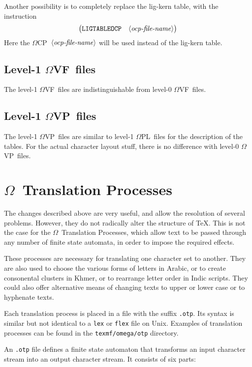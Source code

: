 \documentclass[fleqn]{article}
\newcommand{\OMEGA}{$\Omega$}
\newcommand{\OCP}{\OMEGA CP}
\newcommand{\OPL}{\OMEGA PL}
\newcommand{\OVF}{\OMEGA VF}
\newcommand{\OVP}{\OMEGA VP}
\newcommand{\showligocp}{\langle\mbox{\emph{ocp-file-name}}\rangle}
\begin{document}
Another possibility is to completely replace the lig-kern table,
with the instruction
\[
\begin{array}{ll}
     \bigl(\texttt{LIGTABLEOCP} & \showligocp\bigr)\\
\end{array}
\]
Here the \OCP\ $\showligocp$ will be used instead of the lig-kern
table.

\subsection{Level-1 \OVF\ files}

The level-1 \OVF\ files are indistinguishable from level-0
\OVF\ files.

\subsection{Level-1 \OVP\ files}

The level-1 \OVP\ files are similar to level-1 \OPL\ files for
the description of the tables.  For the actual character layout
stuff, there is no difference with level-0 \OVP\ files.

\section{\OMEGA\ Translation Processes}
\label{lab:otps}

The changes described above are very useful, and allow the resolution
of several problems.  However, they do not radically alter the
structure of \TeX.  This is not the case for the \OMEGA\ Translation
Processes, which allow text to be passed through any number of finite
state automata, in order to impose the required effects.  

These processes are necessary for translating one character set to
another.  They are also used to choose the various forms of letters in
Arabic, or to create consonental clusters in Khmer, or to rearrange
letter order in Indic scripts.  They could also offer alternative
means of changing texts to upper or lower case or to hyphenate texts.

Each translation process is placed in a file with the suffix \verb|.otp|.
Its syntax is similar but not identical to a \texttt{lex} or
\texttt{flex} file on Unix.  Examples of translation processes can 
be found in the \texttt{texmf/omega/otp} directory.

An \verb|.otp| file defines a finite state automaton that transforms
an input character stream into an output character stream.  
It consists of six parts:
\end{document}
